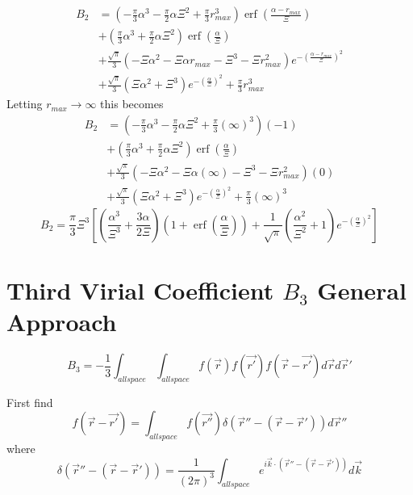 \documentclass[double,12pt]{beavtex}
\begin{document}
\begin{align}
  B_2 &= \left(-\frac{\pi}{3}\alpha^3-\frac{\pi}{2}\alpha\Xi^2+\frac{\pi}{3}r_{max}^3\right)\operatorname{erf}\left(\frac{\alpha-r_{max}}{\Xi}\right) \\
      &+ \left(\frac{\pi}{3}\alpha^3+\frac{\pi}{2}\alpha\Xi^2\right)\operatorname{erf}\left(\frac{\alpha}{\Xi}\right) \\
      &+ \frac{\sqrt{\pi}}{3}\left(-\Xi\alpha^2-\Xi\alpha r_{max}-\Xi^3-\Xi r_{max}^2\right)e^{-{\left(\frac{\alpha-r_{max}}{\Xi}\right)^2}} \\
      &+ \frac{\sqrt{\pi}}{3}\left(\Xi\alpha^2+\Xi^3\right)e^{-\left(\frac{\alpha}{\Xi}\right)^2}+\frac{\pi}{3}r_{max}^3 
\end{align}
Letting $r_{max}\rightarrow\infty$ this becomes
\begin{align}
  B_2 &= \left(-\frac{\pi}{3}\alpha^3-\frac{\pi}{2}\alpha\Xi^2+\frac{\pi}{3}\left(\infty\right)^3\right)\left(-1\right) \\
      &+ \left(\frac{\pi}{3}\alpha^3+\frac{\pi}{2}\alpha\Xi^2\right)\operatorname{erf}\left(\frac{\alpha}{\Xi}\right) \\
      &+ \frac{\sqrt{\pi}}{3}\left(-\Xi\alpha^2-\Xi\alpha\left(\infty\right)-\Xi^3-\Xi r_{max}^2\right)\left(0\right) \\
      &+ \frac{\sqrt{\pi}}{3}\left(\Xi\alpha^2+\Xi^3\right)e^{-\left(\frac{\alpha}{\Xi}\right)^2}+\frac{\pi}{3}\left(\infty\right)^3 
\end{align}
\begin{equation}B_2 = \frac{\pi}{3}\Xi^3\left[\left(\frac{\alpha^3}{\Xi^3}+\frac{3\alpha}{2\Xi}\right)\left(1+\operatorname{erf}\left(\frac{\alpha}{\Xi}\right)\right)+\frac{1}{\sqrt{\pi}}\left(\frac{\alpha^2}{\Xi^2}+1\right)e^{-\left(\frac{\alpha}{\Xi}\right)^2}\right]\end{equation}

\section{Third Virial Coefficient $B_{3}$ General Approach}

\begin{equation}\label{B3}B_3=-\frac{1}{3}\int_{allspace}\int_{allspace}f(\vec{r})f(\vec{r'})f(\vec{r}-\vec{r'})d\vec rd\vec r'\end{equation}

First find
\begin{equation}f(\vec{r}-\vec{r'})=\int_{allspace}f(\vec{r''})\delta(\vec{r}''-(\vec{r}-\vec{r}'))d\vec r'' \end{equation}
where
\begin{equation}{\delta}(\vec{r}''-(\vec{r}-\vec{r}'))={ \frac{1}{\left(2\pi\right)^3}\int_{allspace} e^{i\vec k\cdot (\vec{r}''-(\vec r-\vec r'))}d\vec{k}}\end{equation} 
\end{document}
